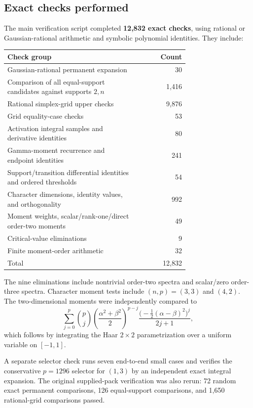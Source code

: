 \documentclass[11pt]{article}
\theoremstyle{definition}\newtheorem{definition}[theorem]{Definition}
\theoremstyle{remark}\newtheorem{remark}[theorem]{Remark}
\begin{document}
\subsection{Exact checks performed}
The main verification script completed \textbf{12,832 exact checks}, using rational or Gaussian-rational arithmetic and symbolic polynomial identities. They include:
\begin{center}
\begin{tabular}{@{}p{0.73\linewidth}r@{}}
\toprule
Check group&Count\\
\midrule
Gaussian-rational permanent expansion&30\\
Comparison of all equal-support candidates against supports $2,n$&1,416\\
Rational simplex-grid upper checks&9,876\\
Grid equality-case checks&53\\
Activation integral samples and derivative identities&80\\
Gamma-moment recurrence and endpoint identities&241\\
Support/transition differential identities and ordered thresholds&54\\
Character dimensions, identity values, and orthogonality&992\\
Moment weights, scalar/rank-one/direct order-two moments&49\\
Critical-value eliminations&9\\
Finite moment-order arithmetic&32\\
\midrule
Total&12,832\\
\bottomrule
\end{tabular}
\end{center}
The nine eliminations include nontrivial order-two spectra and scalar/zero order-three spectra. Character moment tests include $(n,p)=(3,3)$ and $(4,2)$. The two-dimensional moments were independently compared to
\[
 \sum_{j=0}^p\binom pj
 \left(\frac{\alpha^2+\beta^2}{2}\right)^{p-j}
 \frac{\bigl(-\tfrac12(\alpha-\beta)^2\bigr)^j}{2j+1},
\]
which follows by integrating the Haar $2\times2$ parametrization over a uniform variable on $[-1,1]$.

A separate selector check runs seven end-to-end small cases and verifies the conservative $p=1296$ selector for $(1,3)$ by an independent exact integral expansion. The original supplied-pack verification was also rerun: 72 random exact permanent comparisons, 126 equal-support comparisons, and 1,650 rational-grid comparisons passed.
\end{document}

